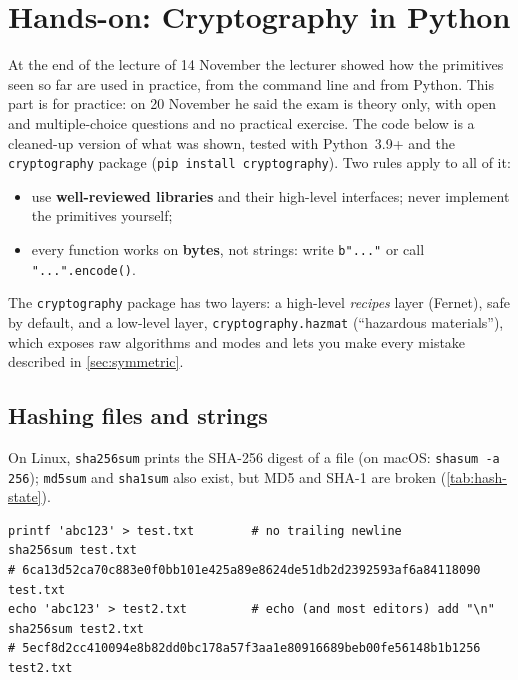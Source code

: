 \section{Hands-on: Cryptography in Python}
\label{sec:crypto-lab}

At the end of the lecture of 14 November the lecturer showed how the primitives seen so far are used in practice, from the command line and from Python. This part is for practice: on 20 November he said the exam is theory only, with open and multiple-choice questions and no practical exercise. The code below is a cleaned-up version of what was shown, tested with Python~3.9+ and the \texttt{cryptography} package (\texttt{pip install cryptography}). Two rules apply to all of it:
\begin{itemize}
    \item use \textbf{well-reviewed libraries} and their high-level interfaces; never implement the primitives yourself;
    \item every function works on \textbf{bytes}, not strings: write \texttt{b"..."} or call \texttt{"...".encode()}.
\end{itemize}

The \texttt{cryptography} package has two layers: a high-level \emph{recipes} layer (Fernet), safe by default, and a low-level layer, \texttt{cryptography.hazmat} (\enquote{hazardous materials}), which exposes raw algorithms and modes and lets you make every mistake described in \cref{sec:symmetric}.

\subsection{Hashing files and strings}

On Linux, \texttt{sha256sum} prints the SHA-256 digest of a file (on macOS: \texttt{shasum -a 256}); \texttt{md5sum} and \texttt{sha1sum} also exist, but MD5 and SHA-1 are broken (\cref{tab:hash-state}).

\begin{verbatim}
printf 'abc123' > test.txt        # no trailing newline
sha256sum test.txt
# 6ca13d52ca70c883e0f0bb101e425a89e8624de51db2d2392593af6a84118090  test.txt
echo 'abc123' > test2.txt         # echo (and most editors) add "\n"
sha256sum test2.txt
# 5ecf8d2cc410094e8b82dd0bc178a57f3aa1e80916689beb00fe56148b1b1256  test2.txt
\end{verbatim}

